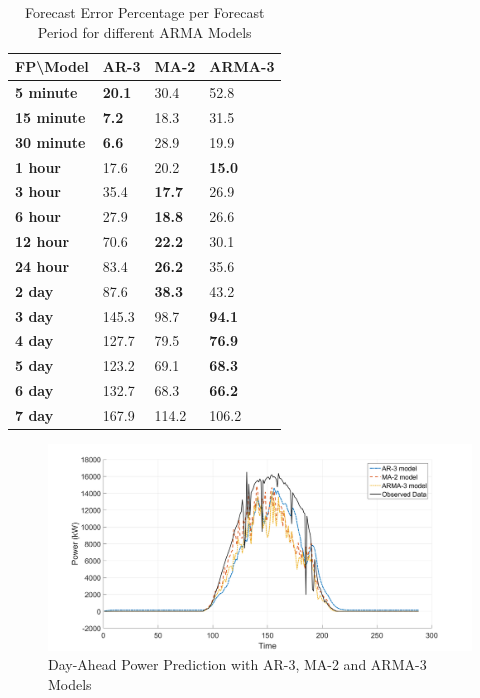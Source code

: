\documentclass[journal]{IEEEtran}
\begin{document}
\begin{table}[htpb]
  \centering
  \caption{Forecast Error Percentage per Forecast Period for different ARMA Models}
\begin{tabular}{|l|l|l|l|}
\hline
\textbf{FP\textbackslash{}Model} & \textbf{AR-3} & \textbf{MA-2} & \textbf{ARMA-3} \\ \hline
\textbf{5 minute}                & \textbf{20.1} & 30.4          & 52.8            \\ \hline
\textbf{15 minute}               & \textbf{7.2}  & 18.3          & 31.5            \\ \hline
\textbf{30 minute}               & \textbf{6.6}  & 28.9          & 19.9            \\ \hline
\textbf{1 hour}                  & 17.6          & 20.2          & \textbf{15.0}   \\ \hline
\textbf{3 hour}                  & 35.4          & \textbf{17.7} & 26.9            \\ \hline
\textbf{6 hour}                  & 27.9          & \textbf{18.8} & 26.6            \\ \hline
\textbf{12 hour}                 & 70.6          & \textbf{22.2} & 30.1            \\ \hline
\textbf{24 hour}                 & 83.4          & \textbf{26.2} & 35.6            \\ \hline
\textbf{2 day}                   & 87.6          & \textbf{38.3} & 43.2            \\ \hline
\textbf{3 day}                   & 145.3         & 98.7          & \textbf{94.1}   \\ \hline
\textbf{4 day}                   & 127.7         & 79.5          & \textbf{76.9}   \\ \hline
\textbf{5 day}                   & 123.2         & 69.1          & \textbf{68.3}   \\ \hline
\textbf{6 day}                   & 132.7         & 68.3          & \textbf{66.2}   \\ \hline
\textbf{7 day}                   & 167.9         & 114.2         & 106.2           \\ \hline
\end{tabular}
\label{tab4}
\end{table}

\begin{figure}[htpb]
	\centering
	\includegraphics[scale=0.2]{ARMA_model_selection.png}
	\caption{Day-Ahead Power Prediction with AR-3, MA-2 and ARMA-3 Models}
	\label{fig12} %
\end{figure}
\end{document}

